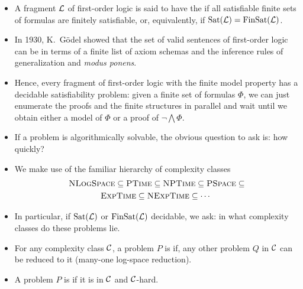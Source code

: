 \documentclass{beamer}
\begin{document}
\begin{frame}
\begin{itemize}
\item 
A fragment $\mathcal{L}$ of first-order logic is said to have the  if all satisfiable finite sets of formulas
are finitely satisfiable, or, equivalently,
if $\mbox{\rm Sat}(\mathcal{L}) = \mbox{\rm FinSat}(\mathcal{L})$. 
\item In 1930, K.~G\"{o}del showed that the set of valid sentences of first-order logic can be 
in terms of a finite list of axiom schemas and the inference rules of generalization and \textit{modus ponens}.
\item 
Hence, every fragment of first-order logic with the finite model property has a decidable satisfiability problem: given a finite set of formulas $\Phi$, we can just enumerate the proofs and the finite structures in parallel and wait until we obtain either a model of $\Phi$ or a proof of $\neg 
\bigwedge \Phi$.
\end{itemize}
\end{frame}

\begin{frame}
\begin{itemize}
\item If a problem is algorithmically
solvable, the obvious question to ask is: how quickly? 
\item We make use of the familiar hierarchy of complexity classes
\begin{multline*}
\textsc{NLogSpace} \subseteq \textsc{PTime} \subseteq \textsc{NPTime} \subseteq \textsc{PSpace} \subseteq\\ 
  \textsc{ExpTime} \subseteq \textsc{NExpTime}{} \subseteq \cdots \hspace {0.125cm}
\end{multline*}
\item In particular, if $\mbox{\rm Sat}(\mathcal{L})$ or $\mbox{\rm FinSat}(\mathcal{L})$ decidable, we
ask: in what complexity classes do these problems lie.
\item For any complexity class  $\mathcal{C}$, a problem $P$ is 
if, any other problem $Q$ in $\mathcal{C}$ can be reduced to it (many-one log-space reduction). 
\item A problem $P$ is  if it is in $\mathcal{C}$ and $\mathcal{C}$-hard.
\end{itemize}
\end{frame}
\end{document}
